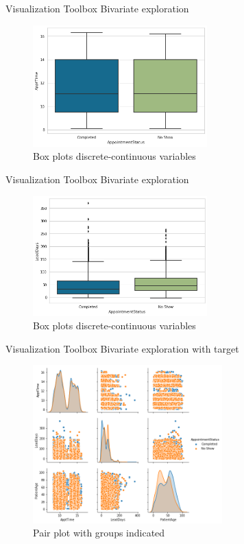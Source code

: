 \documentclass[10pt]{beamer}
\begin{document}
\begin{frame}{Visualization Toolbox}
Bivariate exploration
	\begin{figure}	
		\caption{Box plots discrete-continuous variables}
		\includegraphics[width=0.6\textwidth, center, trim=0cm 0cm 0 0cm]{images/boxplot_appt_time.png}
	\end{figure}
\end{frame}

\begin{frame}{Visualization Toolbox}
Bivariate exploration
	\begin{figure}	
		\caption{Box plots discrete-continuous variables}
		\includegraphics[width=0.6\textwidth, center, trim=0cm 0cm 0 0cm]{images/boxplot.png}
	\end{figure}
\end{frame}

\begin{frame}{Visualization Toolbox}
Bivariate exploration with target 
	\begin{figure}	
		\caption{Pair plot with groups indicated}
		\includegraphics[width=0.65\textwidth, center, trim=0cm 0cm 0 0cm]{images/pair_plot_groups.png}
	\end{figure}
\end{frame}
\end{document}
